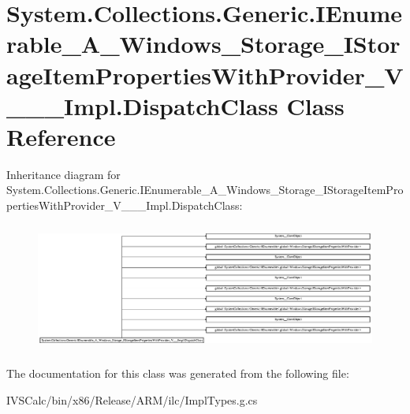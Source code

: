 \hypertarget{class_system_1_1_collections_1_1_generic_1_1_i_enumerable___a___windows___storage___i_storage_ite685907795c29a81fd5f4161085acd1b}{}\section{System.\+Collections.\+Generic.\+I\+Enumerable\+\_\+\+A\+\_\+\+Windows\+\_\+\+Storage\+\_\+\+I\+Storage\+Item\+Properties\+With\+Provider\+\_\+\+V\+\_\+\+\_\+\+\_\+\+Impl.\+Dispatch\+Class Class Reference}
\label{class_system_1_1_collections_1_1_generic_1_1_i_enumerable___a___windows___storage___i_storage_ite685907795c29a81fd5f4161085acd1b}
Inheritance diagram for System.\+Collections.\+Generic.\+I\+Enumerable\+\_\+\+A\+\_\+\+Windows\+\_\+\+Storage\+\_\+\+I\+Storage\+Item\+Properties\+With\+Provider\+\_\+\+V\+\_\+\+\_\+\+\_\+\+Impl.\+Dispatch\+Class\+:\begin{figure}[H]
\begin{center}
\leavevmode
\includegraphics[height=4.260027cm]{class_system_1_1_collections_1_1_generic_1_1_i_enumerable___a___windows___storage___i_storage_ite685907795c29a81fd5f4161085acd1b}
\end{center}
\end{figure}


The documentation for this class was generated from the following file\+:\begin{DoxyCompactItemize}
\item 
I\+V\+S\+Calc/bin/x86/\+Release/\+A\+R\+M/ilc/Impl\+Types.\+g.\+cs\end{DoxyCompactItemize}
